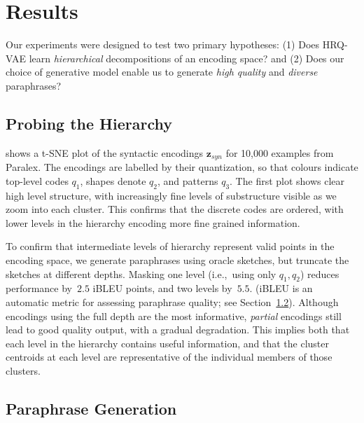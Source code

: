 \documentclass[11pt]{article}
\begin{document}
\section{Results}

Our experiments were designed to test two primary hypotheses: (1) Does HRQ-VAE learn \textit{hierarchical} decompositions of an encoding space? and (2) Does our choice of generative model enable us to generate\textit{ high quality} and \textit{diverse} paraphrases? 



\subsection{Probing the Hierarchy}
\label{sec:probing-hierarchy}

 shows a t-SNE \cite{tsne} plot of the syntactic encodings $\textbf{z}_{syn}$ for 10,000 examples from Paralex. The encodings are labelled by their quantization, so that colours indicate top-level codes $q_1$, shapes denote $q_2$, and patterns $q_3$. The first plot shows clear high level structure, with increasingly fine levels of substructure visible as we zoom into each cluster. This confirms that the discrete codes are ordered, with lower levels in the hierarchy encoding more fine grained information. 

To confirm that intermediate levels of hierarchy represent valid
points in the encoding space, we generate paraphrases using oracle
sketches, but truncate the sketches at different depths. Masking one level (i.e.,~using only $q_1,q_2$) reduces performance by~$2.5$ iBLEU points,
and two levels by~$5.5$. (iBLEU is an automatic metric for assessing
paraphrase quality; see Section~\ref{sec:paraphr-gener}). Although
encodings using the full depth are the most informative,
\textit{partial} encodings
still lead to good quality output, with a gradual degradation. This implies both that each level
in the hierarchy contains useful information, and that the cluster
centroids at each level are representative of the individual members
of those clusters.









\subsection{Paraphrase Generation}
\label{sec:paraphr-gener}
\end{document}
